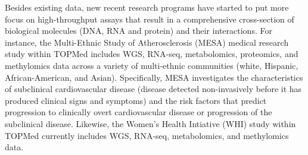 \documentclass[letter]{bioinfo}
\begin{document}
	
	Besides existing data, new recent research programs have started to put more focus on high-throughput assays that result in a comprehensive cross-section of biological molecules (DNA, RNA and protein) and their interactions. For instance, the Multi-Ethnic Study of Atherosclerosis (MESA) medical research study \citep{Bild:2002:MultiEthnic} within TOPMed includes WGS, RNA-seq, metabolomics, proteomics, and methylomics data across a variety of multi-ethnic communities (white, Hispanic, African-American, and Asian).  Specifically, MESA investigates the characteristics of subclinical cardiovascular disease (disease detected non-invasively before it has produced clinical signs and symptoms) and the risk factors that predict progression to clinically overt cardiovascular disease or progression of the subclinical disease.  Likewise, the Women's Health Intiative (WHI) study \citep{NHLBI:1991:Women} within TOPMed currently includes WGS, RNA-seq, metabolomics, and methylomics data.  
\end{document}
